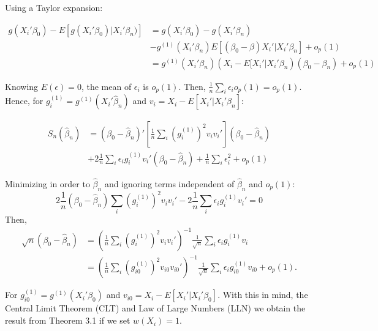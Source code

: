 \documentclass[a4paper]{article}
\begin{document}
Using a Taylor expansion:

\begin{align*}
g(X_i'\beta_0) - E[g(X_i'\beta_0)|X_i'\beta_n)] & = g(X_i'\beta_0) - g(X_i'\beta_n) \\
											 & - g^{(1)}(X_i'\beta_n)E[(\beta_0 - \beta)X_i'|X_i'\beta_n] + o_p(1) \\
				                              & = g^{(1)}(X_i'\beta_n)( X_i - E[X_i'|X_i'\beta_n)(\beta_0 - \beta_n) + o_p(1)
\end{align*}


Knowing $E(\epsilon) = 0$, the mean of $\epsilon_i$ is $o_p(1)$. Then, $\frac{1}{n}\sum_i\epsilon_io_p(1) = o_p(1)$. Hence, for $g_{i}^{(1)} = g^{(1)}(X_i'\hat{\beta}_n)$ and $v_i = X_i - E[X_i'|X_i'\hat{\beta}_n]$:

\begin{align*}
S_{n}(\hat{\beta}_n) & = (\beta_0 - \hat{\beta}_n)'\left[\frac{1}{n}\sum_i (g_i^{(1)})^2v_iv_i'\right](\beta_0 - \hat{\beta}_n) \\
             & + 2\frac{1}{n}\sum_i\epsilon_ig_i^{(1)}v_i'(\beta_0 - \hat{\beta}_n) + \frac{1}{n}\sum_i \epsilon_i^2 + o_p(1)
\end{align*}

Minimizing in order to $\hat{\beta}_n$ and ignoring terms independent of $\hat{\beta}_n$ and $o_p(1)$:
\[2\frac{1}{n}(\beta_0 - \hat{\beta}_n)\sum_i(g_{i}^{(1)})^2v_iv_i' - 2\frac{1}{n}\sum_i\epsilon_ig_i^{(1)}v_i' = 0 \]
Then, 
\begin{align*}
\sqrt{n}(\beta_0 - \hat{\beta}_n) & = (\frac{1}{n}\sum_i(g_{i}^{(1)})^2v_iv_i')^{-1}\frac{1}{\sqrt{n}}\sum_i\epsilon_i g_{i}^{(1)}v_i \\
     					  & = (\frac{1}{n}\sum_i(g_{i0}^{(1)})^2v_{i0}v_{i0}')^{-1}\frac{1}{\sqrt{n}}\sum_i\epsilon_i g_{i0}^{(1)}v_{i0} + o_p(1).
\end{align*}

For $g_{i0}^{(1)} = g^{(1)}(X_i'\beta_0)$ and $v_{i0} = X_i - E[X_i'|X_i'\beta_0]$. With this in mind, the Central Limit Theorem (CLT) and Law of Large Numbers (LLN) we obtain the result from Theorem 3.1 if we set $w(X_i) = 1$.
\end{document}
